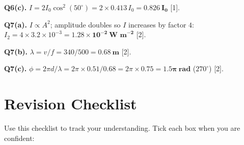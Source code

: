 \begin{markscheme}
\vspace{0.5em}\textbf{Q6(c).} $I = 2I_0\cos^2(50^\circ) = 2\times0.413\,I_0 = \mathbf{0.826\ I_0}$ [1].

\vspace{0.5em}\textbf{Q7(a).} $I \propto A^2$; amplitude doubles so $I$ increases by factor $4$: $I_2 = 4\times3.2\times10^{-3} = \mathbf{1.28\times10^{-2}\ \text{W m}^{-2}}$ [2].

\vspace{0.5em}\textbf{Q7(b).} $\lambda = v/f = 340/500 = \mathbf{0.68\ \text{m}}$ [2].

\vspace{0.5em}\textbf{Q7(c).} $\phi = 2\pi d/\lambda = 2\pi\times0.51/0.68 = 2\pi\times0.75 = \mathbf{1.5\pi\ \text{rad}}$ ($270^\circ$) [2].

\end{markscheme}

\newpage
\section{Revision Checklist}

Use this checklist to track your understanding. Tick each box when you are confident:

